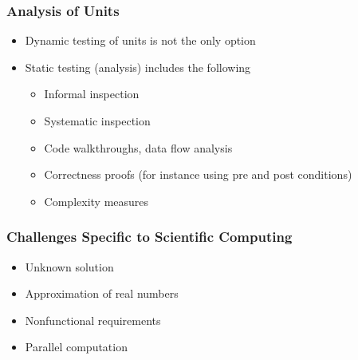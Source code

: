 \documentclass[t,12pt,numbers,fleqn]{beamer}
\begin{document}

\begin{frame}
\frametitle{Analysis of Units}
\begin{itemize}
\item Dynamic testing of units is not the only option
\item Static testing (analysis) includes the following
\begin{itemize}
\item Informal inspection
\item Systematic inspection
\item Code walkthroughs, data flow analysis
\item Correctness proofs (for instance using pre and post conditions)
\item Complexity measures
\end{itemize}
\end{itemize}
\end{frame}


\begin{frame}
\frametitle{Challenges Specific to Scientific Computing}
\begin{itemize}
\item Unknown solution
\item Approximation of real numbers
\item Nonfunctional requirements
\item Parallel computation
\end{itemize}
\end{frame}

\end{document}
